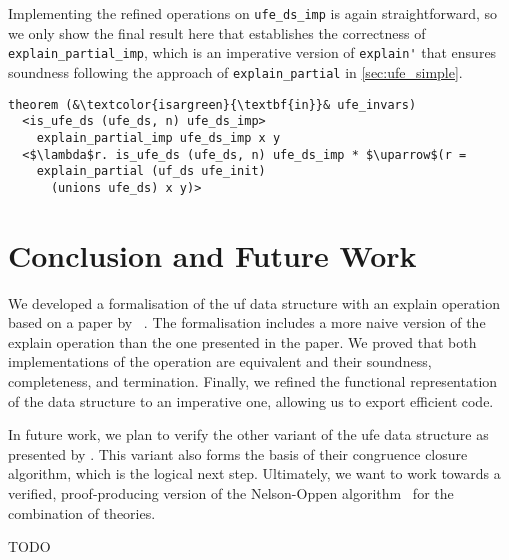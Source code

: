 \documentclass[
  sigplan,
  10pt,
  anonymous,
  review,
  ]{acmart}
\newcommand{\opexplain}{explain}
\begin{document}
Implementing the refined operations on \lstinline|ufe_ds_imp| is again straightforward,
so we only show the final result here that establishes the correctness of \lstinline|explain_partial_imp|,
which is an imperative version of \lstinline|explain'| that ensures soundness following the approach of \lstinline|explain_partial| in \autoref{sec:ufe_simple}.
\begin{lstlisting}
theorem (&\textcolor{isargreen}{\textbf{in}}& ufe_invars)
  <is_ufe_ds (ufe_ds, n) ufe_ds_imp>
    explain_partial_imp ufe_ds_imp x y
  <$\lambda$r. is_ufe_ds (ufe_ds, n) ufe_ds_imp * $\uparrow$(r =
    explain_partial (uf_ds ufe_init)
      (unions ufe_ds) x y)>
\end{lstlisting}

\section{Conclusion and Future Work}
We developed a formalisation of the \acrshort{uf} data structure with an \opexplain{} operation based on a paper by \citeauthor{congcl_proofs}~\cite{congcl_proofs}.
The formalisation includes a more naive version of the \opexplain{} operation than the one presented in the paper.
We proved that both implementations of the operation are equivalent and their soundness, completeness, and termination.
Finally, we refined the functional representation of the data structure to an imperative one, allowing us to export efficient code.

In future work, we plan to verify the other variant of the \acrshort{ufe} data structure as presented by \citeauthor{congcl_proofs}.
This variant also forms the basis of their congruence closure algorithm, which is the logical next step.
Ultimately, we want to work towards a verified, proof-producing version of the Nelson-Oppen algorithm~\cite{nelson_oppen} for the combination of theories.

\begin{acks}
  TODO
\end{acks}




\end{document}
